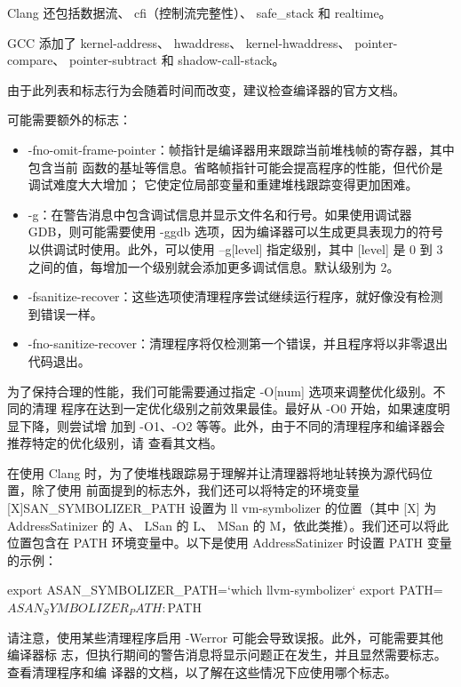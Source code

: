 Clang 还包括数据流、 cfi（控制流完整性）、 safe\_stack 和 realtime。

GCC 添加了 kernel-address、 hwaddress、 kernel-hwaddress、 pointer-compare、 pointer-subtract 和 shadow-call-stack。

由于此列表和标志行为会随着时间而改变，建议检查编译器的官方文档。

可能需要额外的标志：

\begin{itemize}
\item
-fno-omit-frame-pointer：帧指针是编译器用来跟踪当前堆栈帧的寄存器，其中包含当前
函数的基址等信息。省略帧指针可能会提高程序的性能，但代价是调试难度大大增加；
它使定位局部变量和重建堆栈跟踪变得更加困难。

\item
-g：在警告消息中包含调试信息并显示文件名和行号。如果使用调试器 GDB，则可能需要使用 -ggdb 选项，因为编译器可以生成更具表现力的符号以供调试时使用。此外，可以使用 –g[level] 指定级别，其中 [level] 是 0 到 3 之间的值，每增加一个级别就会添加更多调试信息。默认级别为 2。

\item
-fsanitize-recover：这些选项使清理程序尝试继续运行程序，就好像没有检测到错误一样。

\item
-fno-sanitize-recover：清理程序将仅检测第一个错误，并且程序将以非零退出代码退出。
\end{itemize}

为了保持合理的性能，我们可能需要通过指定 -O[num] 选项来调整优化级别。不同的清理
程序在达到一定优化级别之前效果最佳。最好从 -O0 开始，如果速度明显下降，则尝试增
加到 -O1、-O2 等等。此外，由于不同的清理程序和编译器会推荐特定的优化级别，请
查看其文档。

在使用 Clang 时，为了使堆栈跟踪易于理解并让清理器将地址转换为源代码位置，除了使用
前面提到的标志外，我们还可以将特定的环境变量 [X]SAN\_SYMBOLIZER\_PATH 设置为 ll
vm-symbolizer 的位置（其中 [X] 为 AddressSatinizer 的 A、 LSan 的 L、 MSan 的 M，依此类推）。我们还可以将此位置包含在 PATH 环境变量中。以下是使用 AddressSatinizer 时设置
PATH 变量的示例：

\begin{shell}
export ASAN_SYMBOLIZER_PATH=`which llvm-symbolizer`
export PATH=$ASAN_SYMBOLIZER_PATH:$PATH
\end{shell}

请注意，使用某些清理程序启用 -Werror 可能会导致误报。此外，可能需要其他编译器标
志，但执行期间的警告消息将显示问题正在发生，并且显然需要标志。查看清理程序和编
译器的文档，以了解在这些情况下应使用哪个标志。

